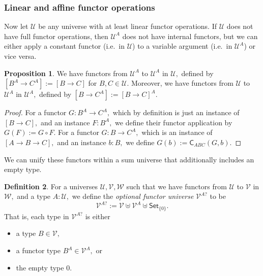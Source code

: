 \documentclass[a4paper]{article}
\theoremstyle{definition}
\newtheorem{definition}{Definition}[section]
\newtheorem{proposition}[definition]{Proposition}
\theoremstyle{remark}
\newcommand{\defn}{\emph}
\newcommand{\U}{\mathcal{U}}
\newcommand{\V}{\mathcal{V}}
\newcommand{\W}{\mathcal{W}}
\newcommand{\nm}{\mathsf}
\newcommand{\universe}{\nm}
\newcommand{\Set}{\universe{Set}}
\newcommand{\combinator}{\nm}
\newcommand{\swapFun}{\combinator{C}}
\begin{document}
\subsubsection*{Linear and affine functor operations}

Now let $\U$ be any universe with at least linear functor operations. If $\U$ does
not have full functor operations, then $\U^A$ does not have internal functors, but
we can either apply a constant functor (i.e.\ in $\U$) to a variable argument
(i.e.\ in $\U^A$) or vice versa.

\begin{proposition}
  \label{prp:fun-univ-linear}
  We have functors from $\U^A$ to $\U^A$ in $\U,$ defined by $[B^A \to C^A] := [B \to C]$
  for $B,C \in \U.$ Moreover, we have functors from $\U$ to $\U^A$ in $\U^A,$
  defined by $[B \to C^A] := [B \to C]^A.$
\end{proposition}
\vspace{-1ex}
\begin{proof}
  For a functor $G : B^A \to C^A,$ which by definition is just an instance of
  $[B \to C],$ and an instance $F : B^A,$ we define their functor application by
  $G(F) := G \circ F.$ For a functor $G : B \to C^A,$ which is an instance of
  $[A \to B \to C],$ and an instance $b : B,$ we define
  $G(b) := \swapFun_{ABC}(G,b).$
\end{proof}

We can unify these functors within a sum universe that additionally includes an
empty type.

\begin{definition}
  For a universes $\U,\V,\W$ such that we have functors from $\U$ to $\V$ in $\W,$
  and a type $A : \U,$ we define the \defn{optional functor universe} $\V^{A?}$ to
  be
  \[\V^{A?} := \V \uplus \V^A \uplus \Set_{\{0\}}.\]
  That is, each type in $\V^{A?}$ is either
  \begin{itemize}
    \item a type $B \in \V,$
    \item a functor type $B^A \in \V^A,$ or
    \item the empty type $0.$
  \end{itemize}
\end{definition}
\end{document}
